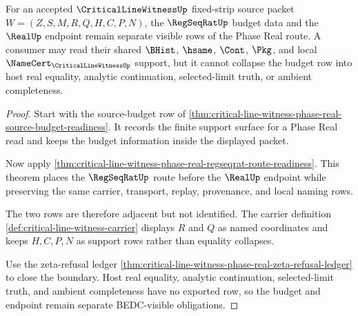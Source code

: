 \begin{theorem}
\label{thm:critical-line-witness-regseqrat-real-budget-separation}
For an accepted $\CriticalLineWitnessUp$ fixed-strip source packet $W=(Z,S,M,R,Q,H,C,P,N)$, the $\RegSeqRatUp$ budget data and the $\RealUp$ endpoint remain separate visible rows of the Phase Real route. A consumer may read their shared $\BHist$, $\hsame$, $\Cont$, $\Pkg$, and local $\NameCert_{\CriticalLineWitnessUp}$ support, but it cannot collapse the budget row into host real equality, analytic continuation, selected-limit truth, or ambient completeness.
\end{theorem}
\begin{proof}
Start with the source-budget row of \autoref{thm:critical-line-witness-phase-real-source-budget-readiness}. It records the finite support surface for a Phase Real read and keeps the budget information inside the displayed packet.

Now apply \autoref{thm:critical-line-witness-phase-real-regseqrat-route-readiness}. This theorem places the $\RegSeqRatUp$ route before the $\RealUp$ endpoint while preserving the same carrier, transport, replay, provenance, and local naming rows.

The two rows are therefore adjacent but not identified. The carrier definition \autoref{def:critical-line-witness-carrier} displays $R$ and $Q$ as named coordinates and keeps $H,C,P,N$ as support rows rather than equality collapses.

Use the zeta-refusal ledger \autoref{thm:critical-line-witness-phase-real-zeta-refusal-ledger} to close the boundary. Host real equality, analytic continuation, selected-limit truth, and ambient completeness have no exported row, so the budget and endpoint remain separate BEDC-visible obligations.
\end{proof}

